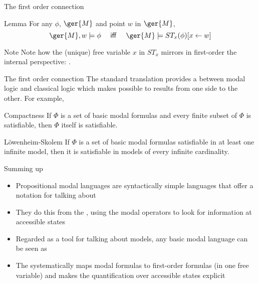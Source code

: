 \documentclass{beamer}
\begin{document}
\begin{slide}{The first order connection}\label{s:21}
\small

\begin{block}{Lemma}
For any $\phi$, $\ger{M}$ and point $w$ in $\ger{M}$, 
\begin{equation*}
\ger{M}, w  \models \phi \text{~~~ \textsf{iff} ~~~}  \ger{M}  \models ST_x(\phi) [x \leftarrow w]
\end{equation*}
\end{block}
\begin{block}{Note}
Note how the (unique) free variable $x$ in $ST_x$ mirrors in first-order the internal perspective: 
.
\end{block}
\end{slide}


\begin{slide}{The first order connection}\label{s:22}
\small
The standard translation provides a  between modal logic and classical logic
which makes possible to  results from one side to the other. For example,
\vspace{0.2cm}

\begin{block}{Compactness}
If $\Phi$ is a set of basic modal formulas and every finite subset of $\Phi$ is satisfiable, then $\Phi$ itself is satisfiable.
\end{block}

\begin{block}{L\"owenheim-Skolem}
If $\Phi$ is a set of basic modal formulas  satisfiable in at least one infinite model, then it is satisfiable in models of every infinite cardinality.
\end{block}
\end{slide}


\begin{slide}{Summing up}\label{s:23}
\small
\begin{itemize}
\item Propositional modal languages are syntactically simple languages that offer a  notation for talking about 
\item They do this from the , using the modal operators to look for information at accessible states
 \item Regarded as a tool for talking about models, any basic modal language can be seen as 
 \item The  systematically maps modal formulas to first-order formulas (in one free variable) and makes the quantification over accessible states explicit
\end{itemize}
\end{slide}
\end{document}
